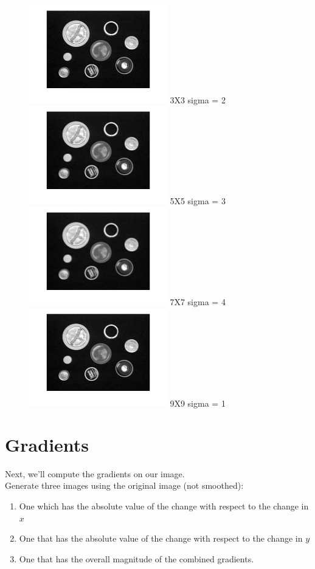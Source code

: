 \documentclass[12pt]{article}
\begin{document}
\begin{figure}[htp]
    \centering
    \includegraphics[width=6cm]{3X3 sigma-2.png} 
    3X3 sigma = 2
    \includegraphics[width=6cm]{5X5 sigma-3.png} 
    5X5 sigma = 3
    \includegraphics[width=6cm]{7X7 sigma-4.png} 
    7X7 sigma = 4
    \includegraphics[width=6cm]{9X9 sigma-1.png} 
    9X9 sigma = 1
\end{figure}
    

\newpage
\section{Gradients}
Next, we’ll compute the gradients on our  image. \\

\noindent
Generate three images using the original image (not smoothed):
\begin{enumerate}
\item One which has the absolute value of the change with respect to the change in $x$
\item One that has the absolute value of the change with respect to the change in $y$
\item One that has the overall magnitude of the combined gradients.
\end{enumerate}
\end{document}
